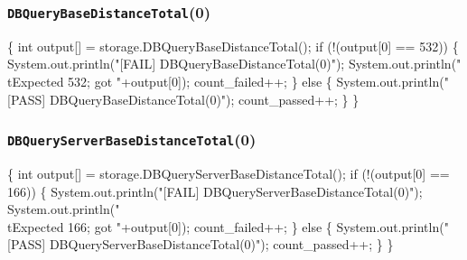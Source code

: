 \documentclass{article}
\def\nwendcode{\endtrivlist \endgroup}
\let\nwdocspar=\par
\begin{document}
\subsubsection{{\tt{}DBQueryBaseDistanceTotal}(0)}
\nwenddocs{}\endmoddef{}
\{
  int output[] = storage.DBQueryBaseDistanceTotal();
  if (!(output[0] == 532)) \{
    System.out.println("[FAIL] DBQueryBaseDistanceTotal(0)");
    System.out.println("\\tExpected 532; got "+output[0]);
    count_failed++;
  \} else \{
    System.out.println("[PASS] DBQueryBaseDistanceTotal(0)");
    count_passed++;
  \}
\}
\nwendcode{}\nwdocspar
\subsubsection{{\tt{}DBQueryServerBaseDistanceTotal}(0)}
\nwenddocs{}\endmoddef{}
\{
  int output[] = storage.DBQueryServerBaseDistanceTotal();
  if (!(output[0] == 166)) \{
    System.out.println("[FAIL] DBQueryServerBaseDistanceTotal(0)");
    System.out.println("\\tExpected 166; got "+output[0]);
    count_failed++;
  \} else \{
    System.out.println("[PASS] DBQueryServerBaseDistanceTotal(0)");
    count_passed++;
  \}
\}
\nwendcode{}\nwdocspar
\end{document}
